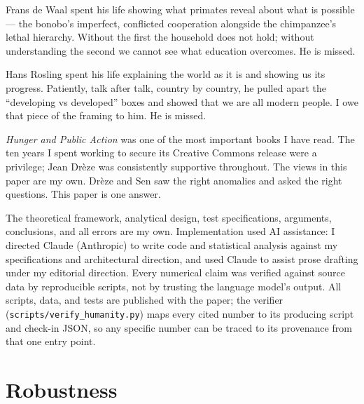 \documentclass[12pt,letterpaper]{article}
\begin{document}
Frans de Waal spent his life showing what primates reveal about what
is possible --- the bonobo's imperfect, conflicted cooperation
alongside the chimpanzee's lethal hierarchy. Without the first the
household does not hold; without understanding the second we cannot
see what education overcomes. He is missed.

Hans Rosling spent his life explaining the world as it is and
showing us its progress. Patiently, talk after talk, country by
country, he pulled apart the ``developing vs developed'' boxes and
showed that we are all modern people. I owe that piece of the framing
to him. He is missed.

\emph{Hunger and Public Action} was one of the most important books I
have read. The ten years I spent working to secure its Creative
Commons release were a privilege; Jean Drèze was consistently
supportive throughout. The views in this paper are my own. Drèze and
Sen saw the right anomalies and asked the right questions. This paper
is one answer.

The theoretical framework, analytical design, test specifications,
arguments, conclusions, and all errors are my own. Implementation
used AI assistance: I directed Claude (Anthropic) to write code and
statistical analysis against my specifications and architectural
direction, and used Claude to assist prose drafting under my
editorial direction. Every numerical claim was verified against
source data by reproducible scripts, not by trusting the language
model's output. All scripts, data, and tests are published with the
paper; the verifier (\texttt{scripts/verify\_humanity.py}) maps every
cited number to its producing script and check-in JSON, so any
specific number can be traced to its provenance from that one entry
point.


\appendix

\section{Robustness}\label{appendix-robustness}
\end{document}
